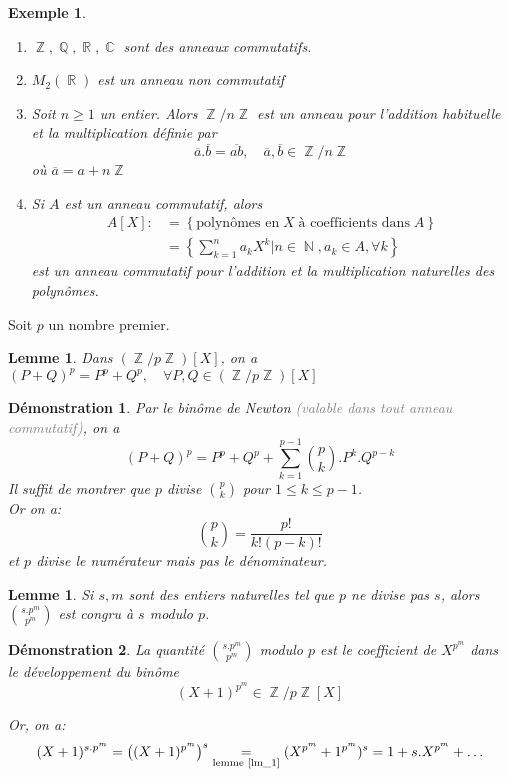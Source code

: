 \documentclass[a4paper, oneside]{report}
\theoremstyle{break}
\newtheorem{lemme}[thm]{Lemme}
\newtheorem{exemple}[thm]{Exemple}
\newtheorem*{demonstration}{Démonstration}
\newcommand{\gray}[1]{\textcolor{gray}{#1}}
\DeclareMathOperator{\R}{\mathbb{R}}
\DeclareMathOperator{\N}{\mathbb{N}}
\DeclareMathOperator{\C}{\mathbb{C}}
\DeclareMathOperator{\Z}{\mathbb{Z}}
\DeclareMathOperator{\Q}{\mathbb{Q}}
\DeclarePairedDelimiter\ens{\left\{ }{\right\} }%
\DeclarePairedDelimiter\pa{\big(}{\big)}%
\renewcommand{\ens}[1]{\left\{ #1 \right\} }%
\newcommand{\us}{\underset}
\newcommand{\ol}{\overline}
\newcommand{\ensem}{\ens}
\begin{document}
\begin{exemple}
\begin{enumerate}
\item  $\Z, \Q, \R, \C$ sont des anneaux commutatifs.

\medbreak

\item $M_2(\R)$ est un anneau non commutatif

\medbreak

\item Soit $n \geq 1$ un entier. Alors $\Z/n\Z$ est un anneau pour l'addition habituelle et la multiplication définie par 
\[
\ol{a} . \ol{b} = \ol{ab},		\quad	\ol{a}, \ol{b} \in \Z/n\Z
\]
où $\ol{a} = a + n \Z$

\medbreak

\item Si $A$ est un anneau commutatif, alors
\begin{align*}
A[X] :&= \ens{\text{polynômes en} \; X \; \text{à coefficients dans} \; A}
\\
&= \ensem{\sum_{k = 1}^n a_k X^k \big| n \in \N, a_k \in A, \forall k}
\end{align*}
est un anneau commutatif pour l'addition et la multiplication naturelles des polynômes.\\
\end{enumerate}
\end{exemple}

\noindent Soit $p$ un nombre premier.
\begin{lemme}
\label{lm_1}
Dans $(\Z/p\Z)[X]$, on a $(P + Q)^p = P^p + Q^p,	\quad	\forall P, Q \in (\Z/p\Z)[X]$
\end{lemme}

\begin{demonstration}
Par le binôme de Newton \gray{(valable dans tout anneau commutatif)}, on a 
\[
(P + Q)^p = P^p + Q^p + \sum_{k = 1}^{p-1} \binom{p}{k} . P^k . Q^{p-k}
\]
Il suffit de montrer que $p$ divise $\binom{p}{k}$ pour $1 \leq k \leq p - 1$.\\
Or on a:
\[
\binom{p}{k} = \frac{p!}{k! (p-k)!}
\]
et $p$ divise le numérateur mais pas le dénominateur.
\end{demonstration}

\begin{lemme}
Si $s, m$ sont des entiers naturelles tel que $p$ ne divise pas $s$, alors $\binom{s.p^m}{p^m}$ est congru à $s$ modulo $p$.
\end{lemme}

\begin{demonstration}
La quantité $\binom{s.p^m}{p^m}$ modulo $p$ est le coefficient de $X^{p^m}$ dans le développement du binôme 
\[
(X + 1)^{p^m} \in \Z/p\Z[X]
\]

Or, on a:
\[
(X + 1)^{s.p^m} = \pa{(X+1)^{p^m}}^s \us{\text{lemme \ref{lm_1}}}{=} (X^{p^m} + 1^{p^m})^s = 1 + s.X^{p^m} + \ldots 
\]
\end{demonstration}
\end{document}
